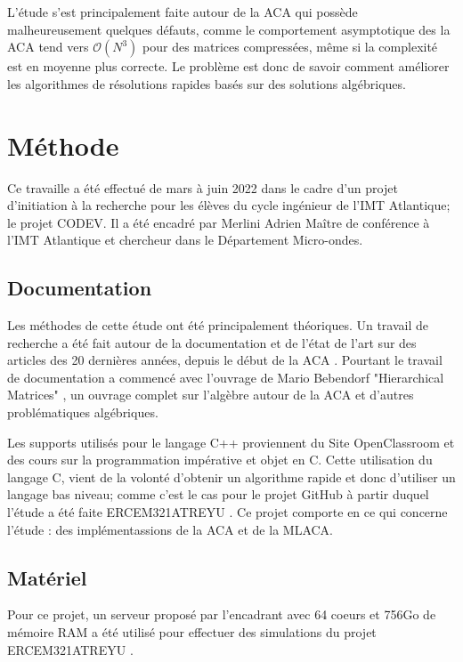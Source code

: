 \documentclass[10pt]{SelfArx} %
\begin{document}
L'étude s'est principalement faite autour de la ACA qui possède malheureusement quelques défauts, comme le comportement asymptotique des la ACA tend vers $\mathcal{O}(N^3)$ \cite{tamayo_multilevel_2011} pour des matrices compressées, même si la complexité est en moyenne plus correcte. Le problème est donc de savoir comment améliorer les algorithmes de résolutions rapides basés sur des solutions algébriques.



\section{Méthode}
Ce travaille a été effectué de mars à juin 2022 dans le cadre d'un projet d'initiation à la recherche pour les élèves du cycle ingénieur de l'IMT Atlantique; le projet CODEV. Il a été encadré par Merlini Adrien Maître de conférence à l'IMT Atlantique et chercheur dans le Département Micro-ondes.
\subsection{Documentation}
Les méthodes de cette étude ont été principalement théoriques. Un travail de recherche a été fait autour de la documentation et de l'état de l'art sur des articles des 20 dernières années, depuis le début de la ACA \cite{zhao_adaptive_2005}. Pourtant le travail de documentation a commencé avec l'ouvrage de Mario Bebendorf "Hierarchical Matrices" \cite{bebendorf_hierarchical_2008}, un ouvrage complet sur l'algèbre autour de la ACA et d'autres problématiques algébriques.

Les supports utilisés pour le langage C++ proviennent du Site OpenClassroom et des cours sur la programmation impérative \cite{OC_prog} et objet \cite{OC_obj} en C. Cette utilisation du langage C, vient de la volonté d'obtenir un algorithme rapide et donc d'utiliser un langage bas niveau; comme c'est le cas pour le projet GitHub à partir duquel l'étude a été faite ERCEM321\textunderscore ATREYU \cite{git_proj}. Ce projet comporte en ce qui concerne l'étude : des implémentassions de la ACA et de la MLACA.
\subsection{Matériel}
Pour ce projet, un serveur proposé par l'encadrant avec 64 coeurs et 756Go de mémoire RAM a été utilisé pour effectuer des simulations du projet ERCEM321\textunderscore ATREYU \cite{git_proj}.
\end{document}
